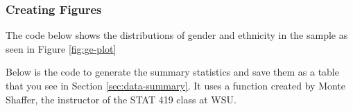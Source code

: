 \documentclass[]{article}
\newenvironment{Shaded}{\begin{snugshade}}{\end{snugshade}}
\newcommand{\DataTypeTok}[1]{\textcolor[rgb]{0.13,0.29,0.53}{#1}}
\newcommand{\KeywordTok}[1]{\textcolor[rgb]{0.13,0.29,0.53}{\textbf{#1}}}
\newcommand{\NormalTok}[1]{#1}
\newcommand{\OperatorTok}[1]{\textcolor[rgb]{0.81,0.36,0.00}{\textbf{#1}}}
\newcommand{\OtherTok}[1]{\textcolor[rgb]{0.56,0.35,0.01}{#1}}
\newcommand{\StringTok}[1]{\textcolor[rgb]{0.31,0.60,0.02}{#1}}
\begin{document}
\subsubsection{Creating Figures}
\label{sec:appendix-create-figures}

The code below shows the distributions of gender and ethnicity in the
sample as seen in Figure \ref{fig:ge-plot}

\begin{Shaded}
\end{Shaded}

Below is the code to generate the summary statistics and save them as a
table that you see in Section \ref{sec:data-summary}. It uses a function
created by Monte Shaffer, the instructor of the STAT 419 class at WSU.
\end{document}
